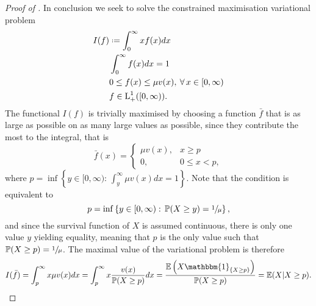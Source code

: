 \documentclass[11pt, a4paper, twoside]{article}
\newcommand*{\defeq}{\mathrel{\vcenter{\baselineskip0.5ex \lineskiplimit0pt
			\hbox{\scriptsize.}\hbox{\scriptsize.}}}=}
\newcommand{\EE}{\mathbb{E}}
\newcommand{\PP}{\mathbb{P}}
\newcommand{\II}{\mathbbm{1}}
\numberwithin{equation}{section}
\begin{document}
\begin{proof}[Proof of ]
		In conclusion we seek to solve the constrained maximisation variational problem
		\begin{align}
			I(f)&\defeq \int_0^\infty x f(x)dx\notag\\&\int_0^\infty f(x)dx=1\notag\\&0\le f(x)\le\mu v(x),\:\forall\,x\in[0,\infty)\notag\\&f\in\text{L}_+^1([0,\infty)).\label{var}
		\end{align}
		The functional $I(f)$ is trivially maximised by choosing a function $\bar{f}$ that is as large as possible on as many large values as possible, since they contribute the most to the integral, that is
		\[\bar{f}(x)=\begin{cases}
			\mu v(x),&x\geq p\\
			0,&0\le x <p,
		\end{cases}\]
		where $p=\inf \left\lbrace y\in[0,\infty):\,\int_y^\infty \mu v(x)dx= 1\right\rbrace$. Note that the condition is equivalent to \[p=\inf \left\lbrace y\in[0,\infty):\,\PP(X\ge y)= \sfrac{1}{\mu}\right\rbrace,\] and since the survival function of $X$ is assumed continuous, there is only one value $y$ yielding equality, meaning that $p$ is the only value such that $\PP(X\ge p)= \sfrac{1}{\mu}$. The maximal value of the variational problem is therefore \[I(\bar{f})=\int_p^\infty x \mu v(x)dx=\int_p^\infty x \frac{v(x)}{\PP(X\ge p)}dx=\frac{\EE \left(X\II_{\{X\ge p\}}\right)}{\PP(X\ge p)}=\EE(X|X\ge p).\]
	\end{proof}
\end{document}
